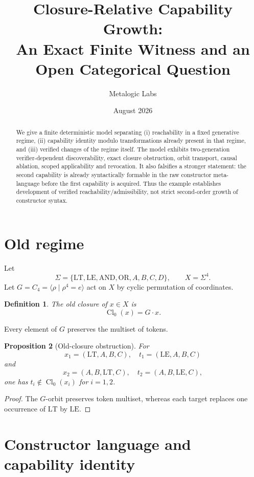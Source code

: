 \documentclass[11pt]{article}
\title{Closure-Relative Capability Growth:\\An Exact Finite Witness and an Open Categorical Question}
\author{Metalogic Labs}
\date{August 2026}
\newtheorem{definition}{Definition}[section]
\newtheorem{proposition}[definition]{Proposition}
\newcommand{\Cl}{\operatorname{Cl}}
\begin{document}
\maketitle

\begin{abstract}
We give a finite deterministic model separating (i) reachability in a fixed generative regime,
(ii) capability identity modulo transformations already present in that regime, and
(iii) verified changes of the regime itself. The model exhibits two-generation
verifier-dependent discoverability, exact closure obstruction, orbit transport, causal
ablation, scoped applicability and revocation. It also falsifies a stronger statement:
the second capability is already syntactically formable in the raw constructor meta-language
before the first capability is acquired. Thus the example establishes development of
verified reachability/admissibility, not strict second-order growth of constructor syntax.
\end{abstract}

\section{Old regime}

Let
\[
\Sigma=\{\mathrm{LT},\mathrm{LE},\mathrm{AND},\mathrm{OR},A,B,C,D\},
\qquad X=\Sigma^4.
\]
Let $G=C_4=\langle \rho\mid \rho^4=e\rangle$ act on $X$ by cyclic permutation of coordinates.

\begin{definition}
The old closure of $x\in X$ is
\[
\Cl_0(x)=G\cdot x.
\]
\end{definition}

Every element of $G$ preserves the multiset of tokens.

\begin{proposition}[Old-closure obstruction]
For
\[
x_1=(\mathrm{LT},A,B,C),\quad t_1=(\mathrm{LE},A,B,C)
\]
and
\[
x_2=(A,B,\mathrm{LT},C),\quad t_2=(A,B,\mathrm{LE},C),
\]
one has $t_i\notin\Cl_0(x_i)$ for $i=1,2$.
\end{proposition}

\begin{proof}
The $G$-orbit preserves token multiset, whereas each target replaces one occurrence of
$\mathrm{LT}$ by $\mathrm{LE}$.
\end{proof}

\section{Constructor language and capability identity}
\end{document}
